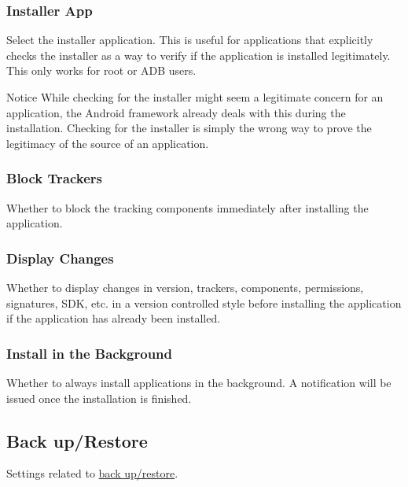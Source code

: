 \subsubsection{Installer App} %
Select the installer application. This is useful for applications that explicitly checks the installer as a way to
verify if the application is installed legitimately. This only works for root or ADB users.

\begin{tip}{Notice}
    While checking for the installer might seem a legitimate concern for an application, the Android framework already
    deals with this during the installation. Checking for the installer is simply the wrong way to prove the legitimacy
    of the source of an application.
\end{tip}

\subsubsection{Block Trackers} %
Whether to block the tracking components immediately after installing the application.

\subsubsection{Display Changes} %
Whether to display changes in version, trackers, components, permissions, signatures, SDK, etc. in a version controlled
style before installing the application if the application has already been installed.

\subsubsection{Install in the Background} %
Whether to always install applications in the background. A notification will be issued once the installation is finished.


\subsection{Back up/Restore}\label{subsec:backup/restore} %
Settings related to \hyperref[sec:backup-restore]{back up/restore}.

